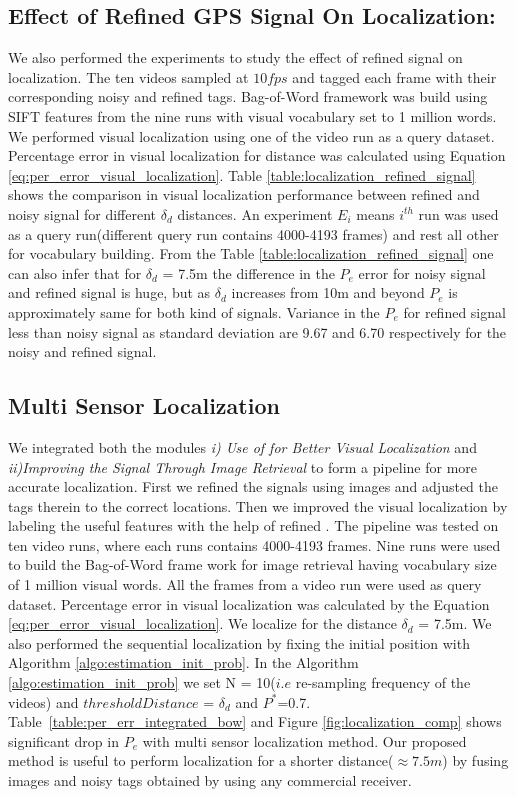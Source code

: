 \subsection{Effect of Refined GPS Signal On Localization:}
We also performed the experiments to study the effect of refined \gps signal on localization. The ten videos sampled at $10fps$ and tagged each frame with their corresponding noisy and refined \gps tags. 
Bag-of-Word framework was build using SIFT features from the nine runs with 
visual vocabulary set to 1 million words. We performed visual localization using 
one of the video run as a query dataset. Percentage error in visual localization 
for distance was calculated
using Equation \ref{eq:per_error_visual_localization}. Table \ref{table:localization_refined_signal} shows the 
comparison in visual localization performance between refined and noisy \gps 
signal for different $\delta_d$ distances. An experiment $E_i$ means $i^{th}$ run was used as a query run(different query run contains 4000-4193 frames) and rest all other for vocabulary building. From the Table \ref{table:localization_refined_signal} 
one can also infer that for $\delta_d$ = 7.5m the difference in the $P_e$ error for noisy \gps signal and refined signal is huge, but as $\delta_d$ increases from 10m and beyond $P_e$ is approximately same for both kind of signals. Variance in the $P_e$ for refined \gps signal 
less than noisy \gps signal as standard deviation are 9.67 and 6.70 respectively 
for the noisy and refined signal.

\subsection{Multi Sensor Localization}
We integrated both the modules {\em i) Use of \gps for Better Visual Localization} and 
{\em ii)Improving the \gps Signal Through Image Retrieval} 
to form a pipeline for more accurate 
localization. First we refined the \gps signals using images and
adjusted the \gps tags therein to the correct locations.
Then we improved the visual localization by labeling the useful 
features with the help of refined \gps. 
The pipeline was tested on ten video runs, where each runs contains
4000-4193 frames. Nine runs were used to build the Bag-of-Word frame 
work for image retrieval having vocabulary size of 1 million visual words.
All the frames from a video run were used as query dataset. Percentage 
error in visual localization was calculated by the 
Equation \ref{eq:per_error_visual_localization}. We localize for the 
distance $\delta_d$ = 7.5m. We also performed the sequential localization
by fixing the initial position with Algorithm \ref{algo:estimation_init_prob}.
In the Algorithm \ref{algo:estimation_init_prob} we set N = 10($i.e$ re-sampling 
frequency of the videos) and $thresholdDistance$ = $\delta_d$ and $P^*$=0.7. 
Table~\ref{table:per_err_integrated_bow} and Figure \ref{fig:localization_comp} shows significant drop in $P_e$ with multi sensor localization method.
Our proposed method is useful to perform localization for a shorter distance($\approx 7.5m$) 
by fusing images and noisy \gps tags obtained by using any commercial \gps receiver. 

